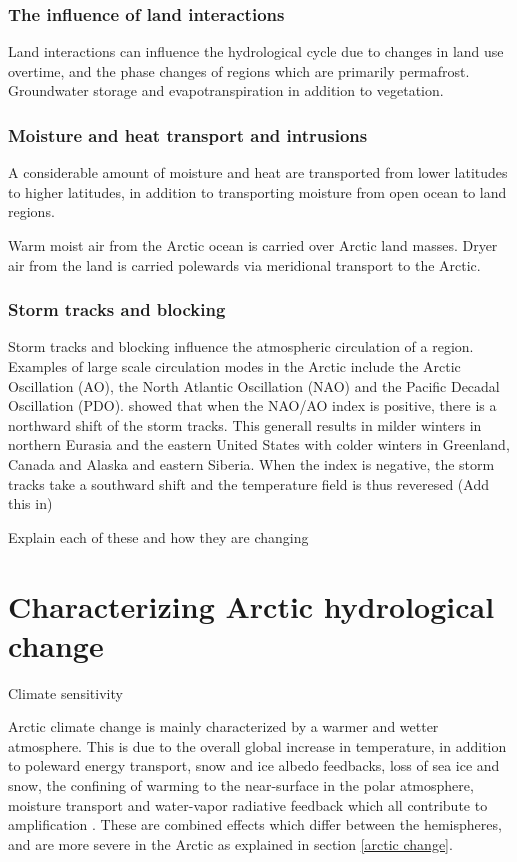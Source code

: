\documentclass[12pt, oneside]{article}
\begin{document}
\subsubsection{The influence of land interactions}
Land interactions can influence the hydrological cycle due to changes in land use overtime, and the phase changes of regions which are primarily permafrost. Groundwater storage and evapotranspiration in addition to vegetation.


\subsubsection{Moisture and heat transport and intrusions}
A considerable amount of moisture and heat are transported from lower latitudes to higher latitudes, in addition to transporting moisture from open ocean to land regions. 

Warm moist air from the Arctic ocean is carried over Arctic land masses. Dryer air from the land is carried polewards via meridional transport to the Arctic. 

\subsubsection{Storm tracks and blocking}
Storm tracks and blocking influence the atmospheric circulation of a region. Examples of large scale circulation modes in the Arctic include the Arctic Oscillation (AO), the North Atlantic Oscillation (NAO) and the Pacific Decadal Oscillation (PDO). \cite{cohen2014recent} showed that when the NAO/AO index is positive, there is a northward shift of the storm tracks. This generall results in milder winters in northern Eurasia and the eastern United States with colder winters in Greenland, Canada and Alaska and eastern Siberia. When the index is negative, the storm tracks take a southward shift and the temperature field is thus reveresed (Add this in)

Explain each of these and how they are changing





\section{Characterizing Arctic hydrological change}
Climate sensitivity 

Arctic climate change is mainly characterized by a warmer and wetter atmosphere. This is due to the overall global increase in temperature, in addition to poleward energy transport, snow and ice albedo feedbacks, loss of sea ice and snow, the confining of warming to the near-surface in the polar atmosphere, moisture transport and water-vapor radiative feedback which all contribute to amplification \cite{serreze2011processes}. These are combined effects which differ between the hemispheres, and are more severe in the Arctic as explained in section \ref{arctic change}.
\end{document}
